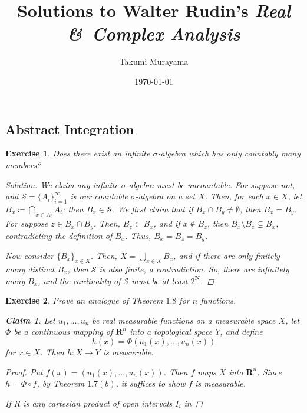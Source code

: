 \documentclass[10pt,letterpaper]{amsart}
\title{Solutions to Walter Rudin's \emph{Real \&\ Complex Analysis}}
\author{Takumi Murayama}
\date{\today}
\newtheorem{exercise}{Exercise}[section]
\newtheorem*{claim}{Claim}
\theoremstyle{definition}
\theoremstyle{remark}
\numberwithin{equation}{exercise}
\begin{document}
\maketitle
\tableofcontents
\begin{multicols}{2}
  \section{Abstract Integration}
  \begin{exercise}
    Does there exist an infinite $\sigma$-algebra which has only countably many
    members?
    \begin{proof}[Solution]
      We claim any infinite $\sigma$-algebra must be uncountable. For suppose
      not, and $\mathcal{S} = \{A_i\}_{i=1}^\infty$ is our countable
      $\sigma$-algebra on a set $X$. Then, for each $x \in X$, let $B_x \coloneqq
      \bigcap_{x \in A_i} A_i$; then $B_x \in \mathcal{S}$. We first claim that
      if $B_x \cap B_y \ne \emptyset$, then $B_x = B_y$. For suppose $z \in B_x
      \cap B_y$. Then, $B_z \subset B_x$, and if $x \notin B_z$, then
      $B_x \setminus B_z \subsetneq B_x$, contradicting the definition of $B_x$.
      Thus, $B_x = B_z = B_y$.
      \par Now consider $\{B_x\}_{x \in X}$. Then, $X = \bigcup_{x \in X} B_x$,
      and if there are only finitely many distinct $B_x$, then $\mathcal{S}$ is
      also finite, a contradiction. So, there are infinitely many $B_x$, and the
      cardinality of $\mathcal{S}$ must be at least $2^\mathbf{N}$.
    \end{proof}
  \end{exercise}
  \begin{exercise}
    Prove an analogue of Theorem $1.8$ for $n$ functions.
    \begin{claim}
      Let $u_1,\ldots,u_n$ be real measurable functions on a measurable space
      $X$, let $\Phi$ be a continuous mapping of $\mathbf{R}^n$ into a
      topological space $Y$, and define
      \begin{equation*}
        h(x) = \Phi(u_1(x),\ldots,u_n(x))
      \end{equation*}
      for $x \in X$. Then $h \colon X \to Y$ is measurable.
    \end{claim}
    \begin{proof}
      Put $f(x) = (u_1(x),\ldots,u_n(x))$. Then $f$ maps $X$ into
      $\mathbf{R}^n$. Since $h = \Phi \circ f$, by Theorem $1.7(b)$, it suffices
      to show $f$ is measurable.
      \par If $R$ is any cartesian product of open intervals $I_i$ in

\end{proof}
\end{exercise}
\end{multicols}
\end{document}
